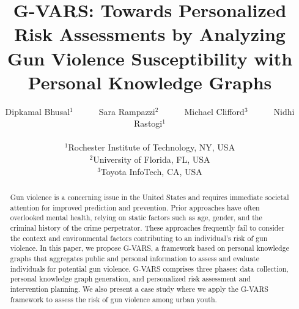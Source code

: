 \documentclass[11pt]{article}
\begin{document}
\title{\textsf{G-VARS}: Towards Personalized Risk Assessments by Analyzing Gun Violence Susceptibility with Personal Knowledge Graphs}


\author{Dipkamal Bhusal$^{1}$~~~~~~Sara Rampazzi$^{2}$~~~~~~Michael Clifford$^{3}$~~~~~~Nidhi Rastogi$^{1}$\\ \\
$^1$Rochester Institute of Technology, NY, USA\\
$^2$University of Florida, FL, USA\\
$^3$Toyota InfoTech, CA, USA
}

\maketitle

\thispagestyle{plain}
\pagestyle{plain}

\begin{abstract}
Gun violence is a concerning issue in the United States and requires immediate societal attention for improved prediction and prevention. Prior approaches have often overlooked mental health, relying on static factors such as age, gender, and the criminal history of the crime perpetrator. These approaches frequently fail to consider the context and environmental factors contributing to an individual’s risk of gun violence. In this paper, we propose \textsf{G-VARS}, a framework based on personal knowledge graphs that aggregates public and personal information to assess and evaluate individuals for potential gun violence. \textsf{G-VARS} comprises three phases: data collection, personal knowledge graph generation, and personalized risk assessment and intervention planning. We also present a case study where we apply the \textsf{G-VARS} framework to assess the risk of gun violence among urban youth.

\end{abstract}
\end{document}

